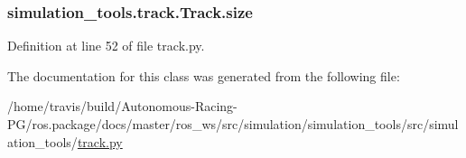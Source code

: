 \subsubsection[{\texorpdfstring{size}{size}}]{\setlength{\rightskip}{0pt plus 5cm}simulation\+\_\+tools.\+track.\+Track.\+size}\hypertarget{classsimulation__tools_1_1track_1_1_track_a69be8807eecacfd98981e206ea3a003f}{}\label{classsimulation__tools_1_1track_1_1_track_a69be8807eecacfd98981e206ea3a003f}


Definition at line 52 of file track.\+py.



The documentation for this class was generated from the following file\+:\begin{DoxyCompactItemize}
\item 
/home/travis/build/\+Autonomous-\/\+Racing-\/\+P\+G/ros.\+package/docs/master/ros\+\_\+ws/src/simulation/simulation\+\_\+tools/src/simulation\+\_\+tools/\hyperlink{track_8py}{track.\+py}\end{DoxyCompactItemize}
